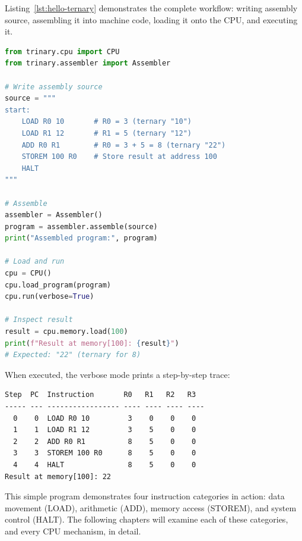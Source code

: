 Listing~\ref{lst:hello-ternary} demonstrates the complete workflow: writing assembly source, assembling it into machine code, loading it onto the CPU, and executing it.

\begin{lstlisting}[language=Python, caption={Writing, assembling, and running a ``Hello, Ternary'' program}, label={lst:hello-ternary}]
from trinary.cpu import CPU
from trinary.assembler import Assembler

# Write assembly source
source = """
start:
    LOAD R0 10       # R0 = 3 (ternary "10")
    LOAD R1 12       # R1 = 5 (ternary "12")
    ADD R0 R1        # R0 = 3 + 5 = 8 (ternary "22")
    STOREM 100 R0    # Store result at address 100
    HALT
"""

# Assemble
assembler = Assembler()
program = assembler.assemble(source)
print("Assembled program:", program)

# Load and run
cpu = CPU()
cpu.load_program(program)
cpu.run(verbose=True)

# Inspect result
result = cpu.memory.load(100)
print(f"Result at memory[100]: {result}")
# Expected: "22" (ternary for 8)
\end{lstlisting}

When executed, the verbose mode prints a step-by-step trace:

\begin{lstlisting}[basicstyle=\ttfamily\small, caption={Execution trace for the Hello Ternary program}, label={lst:trace}]
Step  PC  Instruction       R0   R1   R2   R3
----- --- ----------------- ---- ---- ---- ----
  0    0  LOAD R0 10         3    0    0    0
  1    1  LOAD R1 12         3    5    0    0
  2    2  ADD R0 R1          8    5    0    0
  3    3  STOREM 100 R0      8    5    0    0
  4    4  HALT               8    5    0    0
Result at memory[100]: 22
\end{lstlisting}

This simple program demonstrates four instruction categories in action: data movement (LOAD), arithmetic (ADD), memory access (STOREM), and system control (HALT). The following chapters will examine each of these categories, and every CPU mechanism, in detail.

